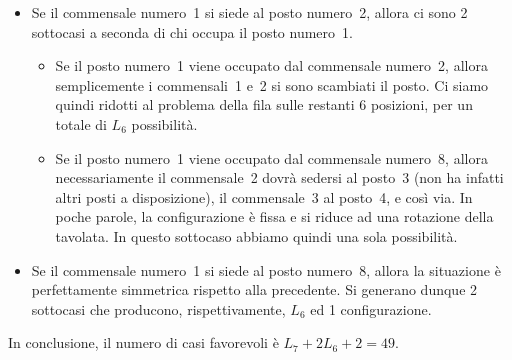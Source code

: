 {\begin{itemize}
	\item  Se il commensale numero~1 si siede al posto numero~2, allora ci sono 2 sottocasi a seconda di chi occupa il posto numero~1.
	\begin{itemize}
		\item Se il posto numero~1 viene occupato dal commensale numero~2, allora semplicemente i commensali~1 e~2 si sono scambiati il posto. Ci siamo quindi ridotti al problema della fila sulle restanti 6 posizioni, per un totale di $L_{6}$ possibilità.
	
		\item Se il posto numero~1 viene occupato dal commensale numero~8, allora necessariamente il commensale~2 dovrà sedersi al posto~3 (non ha infatti altri posti a disposizione), il commensale~3 al posto~4, e così via.  In poche parole, la configurazione è fissa e si riduce ad una rotazione della tavolata.  In questo sottocaso abbiamo quindi una sola possibilità.
	\end{itemize}

	\item  Se il commensale numero~1 si siede al posto numero~8, allora la situazione è perfettamente simmetrica rispetto alla precedente. Si generano dunque 2 sottocasi che producono, rispettivamente, $L_{6}$ ed 1 configurazione.
\end{itemize}

In conclusione, il numero di casi favorevoli è $L_{7}+2L_{6}+2=49$.
}

\renewcommand{\SoluzioniAlternative}{}

\renewcommand{\Osservazioni}{\TitoloOsservazione

Data la relazione ricorrente che soddisfa, la successione $L_{n}$ altro non è che la ben nota successione di Fibonacci.

Inoltre il ragionamento svolto al punto~(b) si generalizza facilmente al caso di $n$ commensali, mostrando che in generale il numero di disposizioni intorno al tavolo che rispettano la proprietà data
è $L_{n-1}+2L_{n-2}+2$.  }

\renewcommand{\Commenti}{}